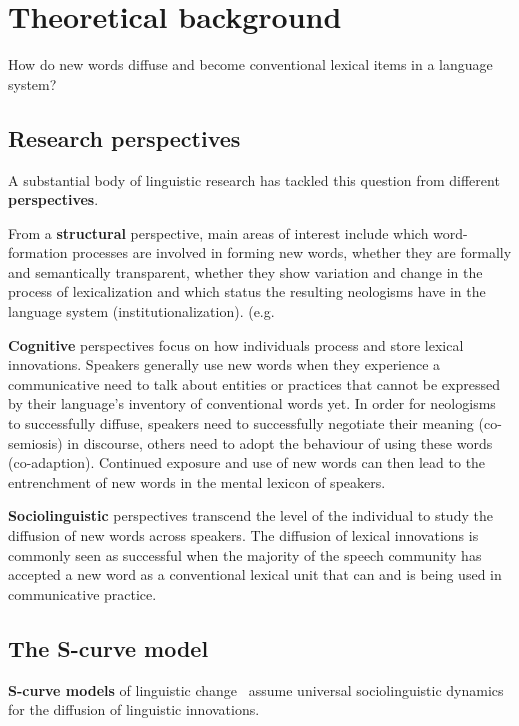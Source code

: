 \documentclass[
  a4paper,
  ]{scrartcl}
\renewcommand{\hw}[1]{\textbf{#1}}
\begin{document}
\section{Theoretical background}

  How do new words diffuse and become conventional lexical items in a language system?

  \subsection{Research perspectives}

    A substantial body of linguistic research has tackled this question from different \hw{perspectives}. \parencite[16]{Schmid2016}

    From a \hw{structural} perspective, main areas of interest include which word-formation processes are involved in forming new words, whether they are formally and semantically transparent, whether they show variation and change in the process of lexicalization and which status the resulting neologisms have in the language system (institutionalization). (e.g. \cite{Bauer1983,Lipka2005}

    \hw{Cognitive} perspectives focus on how individuals process and store lexical innovations. Speakers generally use new words when they experience a communicative need to talk about entities or practices that cannot be expressed by their language's inventory of conventional words yet. In order for neologisms to successfully diffuse, speakers need to successfully negotiate their meaning (co-semiosis) in discourse, others need to adopt the behaviour of using these words (co-adaption). Continued exposure and use of new words can then lead to the entrenchment of new words in the mental lexicon of speakers.~\parencite{Schmid2008}

    \hw{Sociolinguistic} perspectives transcend the level of the individual to study the diffusion of new words across speakers. The diffusion of lexical innovations is commonly seen as successful when the majority of the speech community has accepted a new word as a conventional lexical unit that can and is being used in communicative practice.

  \subsection{The S-curve model}

    \hw{S-curve models} of linguistic change~\parencite{Labov2007,Milroy1992,Nevalainen2015} assume universal sociolinguistic dynamics for the diffusion of linguistic innovations.
\end{document}
